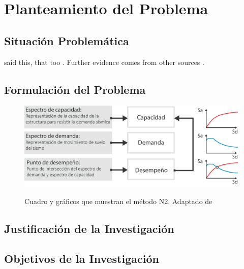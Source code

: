 \section{Planteamiento del Problema}

\subsection{Situación Problemática}

\Textcite{vonDavier2011} said this, that
too \parencite{vonDavier2011,Lassen2006}.  Further evidence comes from
other sources \parencite{Shotton1989,Lassen2006}.  

\lipsum[3]

\lipsum[4]

\subsection{Formulación del Problema}

\lipsum[4]

\lipsum[5]

\begin{figure}[ht]
  \caption{Cuadro y gráficos que muestran el método N2. Adaptado de \cite{deWaal2009}}
  \includegraphics[scale=0.36]{E_IMAGENES/3_Capitulo3/Cap3_Imagen70.png}
	\label{Cap3_Figura8}
\end{figure}

\subsection{Justificación de la Investigación}

\lipsum[6]

\subsection{Objetivos de la Investigación}

\lipsum[7]

